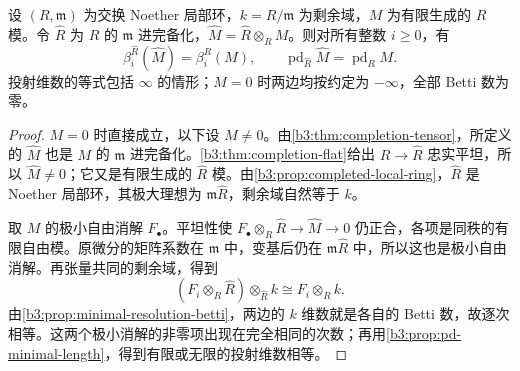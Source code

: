 \begin{corollary}\label{b3:cor:completion-betti-pd}
	设 \((R,\mathfrak m)\) 为交换 Noether 局部环，\(k=R/\mathfrak m\) 为剩余域，\(M\) 为有限生成的 \(R\) 模。令 \(\widehat R\) 为 \(R\) 的 \(\mathfrak m\) 进完备化，\(\widehat M=\widehat R\otimes_RM\)。则对所有整数 \(i\ge0\)，有
	\[
		\beta_i^{\widehat R}(\widehat M)=\beta_i^R(M), \qquad \operatorname{pd}_{\widehat R}\widehat M=\operatorname{pd}_RM.
	\]
	投射维数的等式包括 \(\infty\) 的情形；\(M=0\) 时两边均按约定为 \(-\infty\)，全部 Betti 数为零。
\end{corollary}
\begin{proof}
	\(M=0\) 时直接成立，以下设 \(M\ne0\)。由\cref{b3:thm:completion-tensor}，所定义的 \(\widehat M\) 也是 \(M\) 的 \(\mathfrak m\) 进完备化。\cref{b3:thm:completion-flat}给出 \(R\to\widehat R\) 忠实平坦，所以 \(\widehat M\ne0\)；它又是有限生成的 \(\widehat R\) 模。由\cref{b3:prop:completed-local-ring}，\(\widehat R\) 是 Noether 局部环，其极大理想为 \(\mathfrak m\widehat R\)，剩余域自然等于 \(k\)。

	取 \(M\) 的极小自由消解 \(F_\bullet\)。平坦性使 \(F_\bullet\otimes_R\widehat R\to\widehat M\to0\) 仍正合，各项是同秩的有限自由模。原微分的矩阵系数在 \(\mathfrak m\) 中，变基后仍在 \(\mathfrak m\widehat R\) 中，所以这也是极小自由消解。再张量共同的剩余域，得到
	\[
		(F_i\otimes_R\widehat R)\otimes_{\widehat R}k \cong F_i\otimes_Rk.
	\]
	由\cref{b3:prop:minimal-resolution-betti}，两边的 \(k\) 维数就是各自的 Betti 数，故逐次相等。这两个极小消解的非零项出现在完全相同的次数；再用\cref{b3:prop:pd-minimal-length}，得到有限或无限的投射维数相等。
\end{proof}
